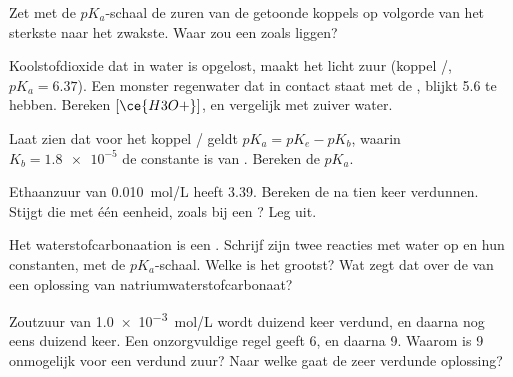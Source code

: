 \begin{exercise}[$\star\star$]\label{exo:g12:ka-and-pka:9}
Zet met de $pK_a$-schaal de zuren van de getoonde koppels op volgorde van
het sterkste naar het zwakste. Waar zou een  zoals 
liggen?
\end{exercise}

\begin{exercise}[$\star\star$]\label{exo:g12:ka-and-pka:10}
Koolstofdioxide dat in water is opgelost, maakt het licht zuur (koppel
/, $pK_a = 6.37$). Een monster regenwater dat in
contact staat met de , blijkt  5.6 te hebben. Bereken
$[\ce{H3O+}]$, en vergelijk met zuiver water.
\end{exercise}

\begin{exercise}[$\star\star$]\label{exo:g12:ka-and-pka:11}
Laat zien dat voor het koppel / geldt
$pK_a = pK_e - pK_b$, waarin
$K_b = \num{1.8e-5}$ de constante is van .
Bereken de $pK_a$.
\end{exercise}

\begin{exercise}[$\star\star\star$]\label{exo:g12:ka-and-pka:12}
Ethaanzuur van \qty{0.010}{mol/L} heeft  3.39. Bereken de  na tien
keer verdunnen. Stijgt die met één eenheid, zoals bij een ?
Leg uit.
\end{exercise}

\begin{exercise}[$\star\star\star$]\label{exo:g12:ka-and-pka:13}
Het waterstofcarbonaation is een . Schrijf zijn twee reacties met
water op en hun constanten, met de $pK_a$-schaal. Welke is het grootst?
Wat zegt dat over de  van een oplossing van natriumwaterstofcarbonaat?
\end{exercise}

\begin{exercise}[$\star\star\star$]\label{exo:g12:ka-and-pka:14}
Zoutzuur van \qty{1.0e-3}{mol/L} wordt duizend keer verdund, en daarna
nog eens duizend keer. Een onzorgvuldige regel geeft  6, en daarna
 9. Waarom is  9 onmogelijk voor een verdund zuur? Naar welke  gaat
de zeer verdunde oplossing?
\end{exercise}


